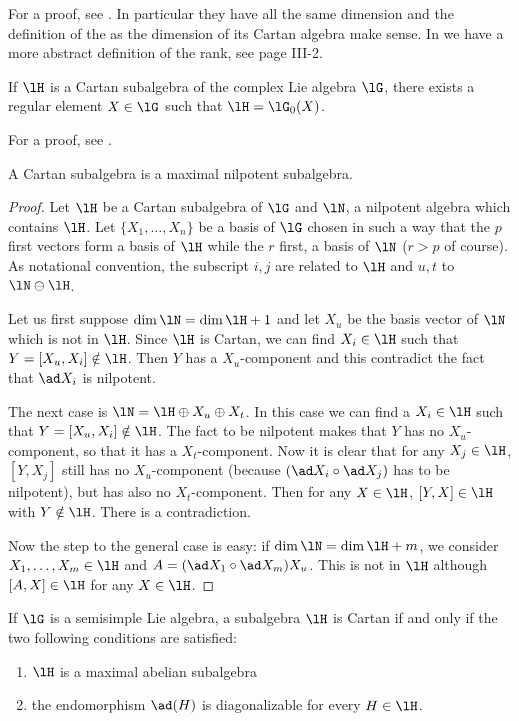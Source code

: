 For a proof, see \cite{SerreSSAlgebres}. In particular they have all the same dimension and the definition of the  as the dimension of its Cartan algebra make sense. In \cite{SerreSSAlgebres} we have a more abstract definition of the rank, see page III-2.

\begin{proposition}     \label{PropCartanLzXtjs}
    If \( \lH\) is a Cartan subalgebra of the complex Lie algebra \( \lG\), there exists a regular element \( X\in\lG\) such that \( \lH=\lG_0(X)\).
\end{proposition}

For a proof, see \cite{SerreSSAlgebres}.

\begin{proposition}\label{prop:Cartan_max_nil}
A Cartan subalgebra is a maximal nilpotent subalgebra.
\end{proposition}

\begin{proof}
Let $\lH$ be a Cartan subalgebra of $\lG$ and $\lN$, a nilpotent algebra which contains $\lH$. Let $\{X_1,\ldots,X_n\}$ be a basis of $\lG$ chosen in such a way that the $p$ first vectors form a basis of $\lH$ while the $r$ first, a basis of $\lN$ ($r>p$ of course). As notational convention, the subscript $i,j$ are related to $\lH$ and $u,t$ to $\lN\ominus\lH$.

Let us first suppose $\dim\lN=\dim\lH+1$ and let $X_u$ be the basis vector of $\lN$ which is not in $\lH$. Since $\lH$ is Cartan, we can find $X_i\in\lH$ such that $Y=[X_u,X_i]\notin\lH$. Then $Y$ has a $X_u$-component and this contradict the fact that $\ad X_i$ is nilpotent.

The next case is $\lN=\lH\oplus X_u\oplus X_t$. In this case we can find a $X_i\in\lH$ such that $Y=[X_u,X_i]\notin\lH$. The fact to be nilpotent makes that $Y$ has no $X_u$-component, so that it has a $X_t$-component. Now it is clear that for any $X_j\in\lH$, $[Y,X_j]$ still has no $X_u$-component (because $(\ad X_i\circ\ad X_j)$ has to be nilpotent), but has also no $X_t$-component. Then for any $X\in\lH$, $[Y,X]\in\lH$ with $Y\notin\lH$. There is a contradiction.

Now the step to the general case is easy: if $\dim\lN=\dim\lH+m$, we  consider $X_1,\ldots,X_m\in\lH$ and $A=(\ad X_1\circ\ad X_m)X_u$. This is not in $\lH$ although $[A,X]\in\lH$ for any $X\in\lH$.
\end{proof}


\begin{proposition}
    If \( \lG\) is a semisimple Lie algebra, a subalgebra \( \lH\) is Cartan if and only if the two following conditions are satisfied:
    \begin{enumerate}
        \item
            \( \lH\) is a maximal abelian subalgebra
        \item
            the endomorphism \( \ad(H)\) is diagonalizable for every \( H\in\lH\).
    \end{enumerate}
\end{proposition}

